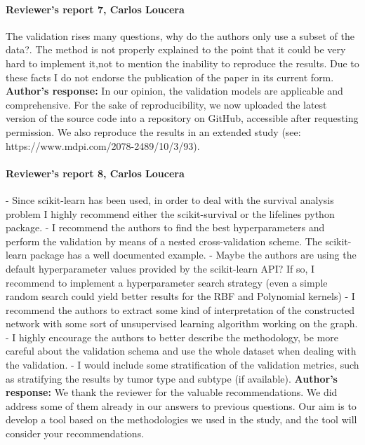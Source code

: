 \documentclass{bmcart}
\begin{document}
\paragraph {Reviewer's report 7, Carlos Loucera}
The validation rises many questions, why do the authors only use a subset of the data?. The method is not properly explained to the point that it could be very hard to implement it,not to mention the inability to reproduce the results.  Due to these facts I do not endorse the publication of the paper in its current form.
\newline \textbf{Author's response:}
In our opinion, the validation models are applicable and comprehensive. For the sake of reproducibility, we now uploaded the latest version of the source code into a repository on GitHub, accessible after requesting permission. We also reproduce the results in an extended study (see: https://www.mdpi.com/2078-2489/10/3/93).



\paragraph {Reviewer's report 8, Carlos Loucera}
- Since scikit-learn has been used, in order to deal with the survival analysis problem I highly recommend either the scikit-survival or the lifelines python package. 
- I recommend the authors to find the best hyperparameters and perform the validation by means of a nested cross-validation scheme. The scikit-learn package has a well documented example. 
- Maybe the authors are using the default hyperparameter values provided by the scikit-learn API? If so, I recommend to implement a hyperparameter search strategy (even a simple random search could yield better results for the RBF and Polynomial kernels) 
- I recommend the authors to extract some kind of interpretation of the constructed network with some sort of unsupervised learning algorithm working on the graph. 
- I highly encourage the authors to better describe the methodology, be more careful about the validation schema and use the whole dataset when dealing with the validation. 
- I would include some stratification of the validation metrics, such as stratifying the results by tumor type and subtype (if available).
\newline \textbf{Author's response:}
 We thank the reviewer for the valuable recommendations. We did address some of them already in our answers to previous questions. Our aim is to develop a tool based on the methodologies we used in the study, and the tool will consider your recommendations. 
\end{document}
